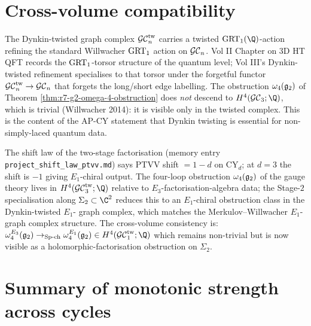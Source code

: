 \section*{Cross-volume compatibility}

\begin{remark}
\label{rem:r7-vol-ii-grt-1-torsor}
The Dynkin-twisted graph complex $\mathcal{GC}^{\mathrm{tw}}_n$ carries a twisted
$\GRT_1(\Q)$-action refining the standard Willwacher $\mathrm{GRT}_1$ action
on $\mathcal{GC}_n$. Vol II Chapter on 3D HT QFT records the $\mathrm{GRT}_1$-torsor
structure of the quantum level; Vol III's Dynkin-twisted refinement
specialises to that torsor under the forgetful functor $\mathcal{GC}^{\mathrm{tw}}_n \to
\mathcal{GC}_n$ that forgets the long/short edge labelling. The obstruction
$\omega_4(\mathfrak{g}_2)$ of Theorem \ref{thm:r7-g2-omega-4-obstruction} does
\emph{not} descend to $H^4(\GC_3; \Q)$, which is trivial (Willwacher
2014): it is visible only in the twisted complex. This is the content
of the AP-CY statement that Dynkin twisting is essential for
non-simply-laced quantum data.
\end{remark}

\begin{remark}
\label{rem:r7-vol-i-shift-law}
The shift law of the two-stage factorisation (memory entry
\texttt{project\_shift\_law\_ptvv.md}) says PTVV shift $= 1 - d$ on
CY$_d$; at $d = 3$ the shift is $-1$ giving $E_1$-chiral output. The
four-loop obstruction $\omega_4(\mathfrak{g}_2)$ of the gauge theory lives in
$H^4(\GCtw_3; \Q)$ relative to $E_3$-factorisation-algebra data; the
Stage-$2$ specialisation along $\Sigma_2 \subset \C^2$ reduces this
to an $E_1$-chiral obstruction class in the Dynkin-twisted $E_1$-
graph complex, which matches the Merkulov--Willwacher $E_1$-graph
complex structure. The cross-volume consistency is:
$\omega_4^{E_3}(\gtwo) \to_{\text{Sp-ch}} \omega_4^{E_1}(\gtwo) \in
H^4(\GCtw_{1}; \Q)$ which remains non-trivial but is now visible as
a holomorphic-factorisation obstruction on $\Sigma_2$.
\end{remark}

\section*{Summary of monotonic strength across cycles}

